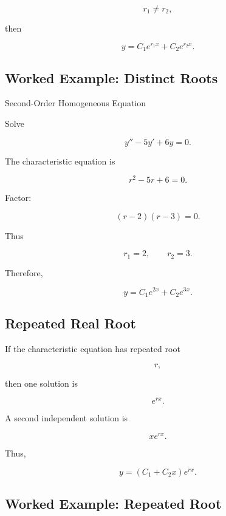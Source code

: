 \[
r_1\neq r_2,
\]

then

\[
\boxed{
y
=
C_1e^{r_1x}
+
C_2e^{r_2x}.
}
\]

\subsection{Worked Example: Distinct Roots}
\label{subsec:worked-distinct-roots}

\begin{workedexamplebox}{Second-Order Homogeneous Equation}

Solve

\[
y''-5y'+6y=0.
\]

The characteristic equation is

\[
r^2-5r+6=0.
\]

Factor:

\[
(r-2)(r-3)=0.
\]

Thus

\[
r_1=2,
\qquad
r_2=3.
\]

Therefore,

\begin{answerbox}
\[
\boxed{
y
=
C_1e^{2x}
+
C_2e^{3x}.
}
\]
\end{answerbox}

\end{workedexamplebox}

\subsection{Repeated Real Root}
\label{subsec:repeated-characteristic-root}

If the characteristic equation has repeated root

\[
r,
\]

then one solution is

\[
e^{rx}.
\]

A second independent solution is

\[
xe^{rx}.
\]

Thus,

\[
\boxed{
y
=
(
C_1+C_2x
)
e^{rx}.
}
\]

\subsection{Worked Example: Repeated Root}
\label{subsec:worked-repeated-root}

